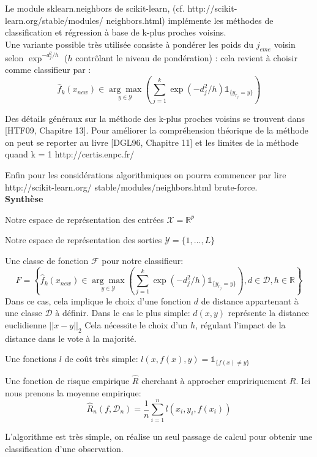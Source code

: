 \documentclass[a4paper]{article}
\theoremstyle{plain}
\begin{document}
Le module sklearn.neighbors de scikit-learn, (cf. http://scikit-learn.org/stable/modules/
neighbors.html) implémente les méthodes de classification et régression à base de k-plus proches voisins.\\

Une variante possible très utilisée consiste à pondérer les poids du $j_{eme}$ voisin selon $\exp^{-d^2_j/h}$ ($h$ contrôlant le niveau de pondération) : cela revient à choisir comme classifieur par : 
$$\hat f_k(x_{new}) \in \underset{y \in \mathcal{Y}}{\arg\max} \left( \sum_{j=1}^{k}\exp(-d^2_j/h) \mathds{1}_{\{y_{r_j}=y\}}  \right)$$




Des détails généraux sur la méthode des k-plus proches voisins se trouvent dans [HTF09, Chapitre 13].
Pour améliorer la compréhension théorique de la méthode on peut se reporter au livre [DGL96, Chapitre
11] et les limites de la méthode quand k = 1 http://certis.enpc.fr/%

Enfin pour les considérations algorithmiques on pourra commencer par lire http://scikit-learn.org/
stable/modules/neighbors.html brute-force.\\

\textbf{Synthèse}\\

\begin{outline}

\1 Notre espace de représentation des entrées $\mathcal{X} = \mathbb{R}^p$

\1 Notre espace de représentation des sorties $\mathcal{Y}=\{1,...,L\}$

\1 Une classe de fonction $\mathcal{F}$ pour notre classifieur: 
$$F = \left\{\hat f_k(x_{new}) \in \underset{y \in \mathcal{Y}}{\arg\max} \left( \sum_{j=1}^{k}\exp(-d^2_j/h) \mathds{1}_{\{y_{r_j}=y\}}  \right), d \in \mathcal{D}, h \in \mathbb{R}\right\}$$
\2 Dans ce cas, cela implique le choix d'une fonction $d$ de distance appartenant à une classe $\mathcal{D}$ à définir. Dans le cas le plus simple: $d(x,y)$ représente la distance euclidienne $||x-y||_2$
\2 Cela nécessite le choix d'un $h$, régulant l'impact de la distance dans le vote à la majorité.

\1 Une fonctions $l$ de coût très simple: $l(x, f(x),y) = \mathds{1}_{\{f(x)\neq y\}} $

\1 Une fonction de risque empirique $\hat R$ cherchant à approcher empririquement $R$. Ici nous prenons la moyenne empirique:
$$\hat R_n(f, \mathcal{D}_n) = \frac{1}{n}\sum_{i=1}^{n}\mathit{l}(x_i,y_i,f(x_i))$$

\1 L'algorithme est très simple, on réalise un seul passage de calcul pour obtenir une classification d'une observation.


\end{outline}
\end{document}

